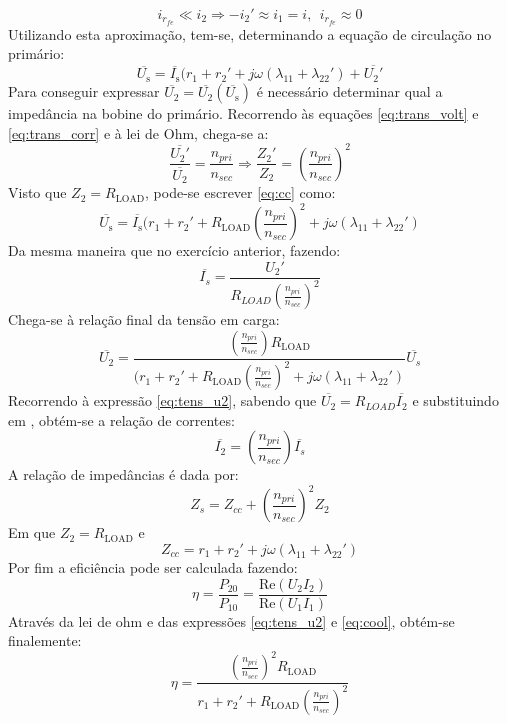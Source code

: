 \documentclass[%
  reprint,
  nofootinbib,
  amsmath,amssymb,
  aps,
  10pt,
]{revtex4-1}
\begin{document}
\begin{equation}
i_{r_{fe}}\ll i_2 \Rightarrow -i_2'\approx i_1=i,\ \ i_{r_{fe}}\approx 0
\end{equation}
Utilizando esta aproximação, tem-se, determinando a equação de circulação no primário:
\begin{equation}
\overline{U_{\mathrm{s}}}=\overline{I_{\mathrm{s}}}(r_1+r_2'+j\omega(\lambda_{11}+\lambda_{22}')+\overline{U_2'}
\label{eq:cc}
\end{equation}
Para conseguir expressar $\overline{U_2}=\overline{U_2}(\overline{U_{\mathrm{s}}})$ é necessário determinar qual a impedância na bobine do primário. Recorrendo às equações \ref{eq:trans_volt} e \ref{eq:trans_corr} e à lei de Ohm, chega-se a:
\begin{equation}
\frac{\overline{U_{2}'}}{\overline{U_{2}}}=\frac{n_{pri}}{n_{sec}}\Rightarrow \frac{Z_2'}{Z_2}=\left (\frac{n_{pri}}{n_{sec}}\right)^2
\end{equation}
Visto que $Z_2=R_{\mathrm{LOAD}}$, pode-se escrever \ref{eq:cc} como:
\begin{equation}
\overline{U_{\mathrm{s}}}=\overline{I_{\mathrm{s}}}(r_1+r_2'+R_{\mathrm{LOAD}}\left(\frac{n_{pri}}{n_{sec}}\right)^2+j\omega(\lambda_{11}+\lambda_{22}')
\label{eq:tens_u2}
\end{equation}
Da mesma maneira que no exercício anterior, fazendo:
\begin{equation}
\overline{I_s}=\frac{U_2'}{R_{LOAD}\left(\frac{n_{pri}}{n_{sec}}\right)^2}
\end{equation}
Chega-se à relação final da tensão em carga:
\begin{equation}
\overline{U_2}=\frac{\left(\frac{n_{pri}}{n_{sec}}\right)R_{\mathrm{LOAD}}}{(r_1+r_2'+R_{\mathrm{LOAD}}\left(\frac{n_{pri}}{n_{sec}}\right)^2+j\omega(\lambda_{11}+\lambda_{22}')}\overline{U_s}
\label{eq:derradeira}
\end{equation}
Recorrendo à expressão \ref{eq:tens_u2}, sabendo que $\overline{U_2}=R_{LOAD}\overline{I_2}$ e substituindo em \label{eq:derradeira}, obtém-se a relação de correntes:
\begin{equation}
\overline{I_2}=\left(\frac{n_{pri}}{n_{sec}}\right)\overline{I_s}
\label{eq:cool}
\end{equation}
A relação de impedâncias é dada por:
\begin{equation}
Z_s=Z_{cc}+\left (\frac{n_{pri}}{n_{sec}}\right)^2Z_2
\end{equation}
Em que $Z_2=R_{\mathrm{LOAD}}$ e
\begin{equation}
Z_{cc}=r_1+r_2'+j\omega(\lambda_{11}+\lambda_{22}')
\end{equation}
Por fim a eficiência pode ser calculada fazendo:
\begin{equation}
\eta=\frac{P_{20}}{P_{10}}=\frac{\mathrm{Re}(U_2I_2)}{\mathrm{Re}(U_1I_1)}
\end{equation}
Através da lei de ohm e das expressões \ref{eq:tens_u2} e \ref{eq:cool}, obtém-se finalemente:
\begin{equation}
\eta=\frac{\left(\frac{n_{pri}}{n_{sec}}\right)^2R_\mathrm{LOAD}}{r_1+r_2'+R_{\mathrm{LOAD}}\left(\frac{n_{pri}}{n_{sec}}\right)^2}
\end{equation}
\end{document}
